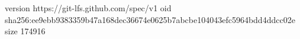 version https://git-lfs.github.com/spec/v1
oid sha256:ee9ebb9383359b47a168dec36674e0625b7abcbe104043efc5964bdd4ddcc02e
size 174916
